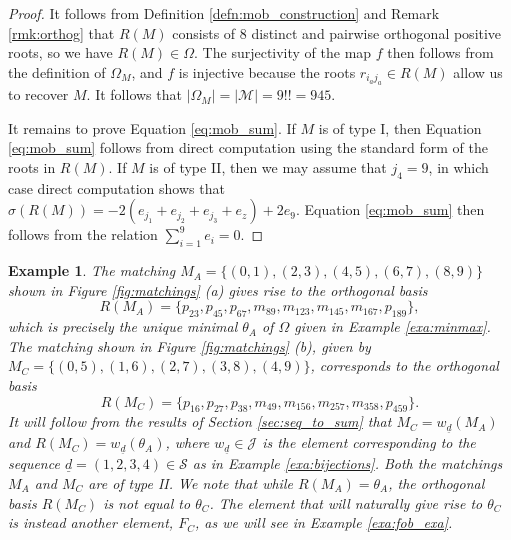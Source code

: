 \documentclass[10pt,a4paper]{amsart}
\newtheorem{exa}[theorem]{Example}
\numberwithin{equation}{section}
\newcommand{\seqd}{\underline{d}}
\newcommand{\calj}{\mathcal{J}}
\newcommand{\calm}{\mathcal{M}}
\newcommand{\cals}{\mathcal{S}}
\newcommand{\ob}{\Omega}
\newcommand{\mob}{\Omega_M}
\newcommand{\abs}[1]{\lvert #1 \rvert}
\begin{document}
\begin{proof}
It follows from Definition \ref{defn:mob_construction} and Remark
\ref{rmk:orthog} that $R(M)$ consists of 8 distinct and pairwise orthogonal
positive roots, so we have $R(M)\in \ob$. The surjectivity of the map $f$ then
follows from the definition of $\mob$, and $f$ is injective because the roots
$r_{i_aj_a}\in R(M)$ allow us to recover $M$. It follows that
$\abs{\mob}=\abs{\calm}=9!!=945.$

It remains to prove Equation \eqref{eq:mob_sum}. If $M$ is of type I, then
Equation \eqref{eq:mob_sum} follows from direct computation using the standard
form of the roots in $R(M)$. If $M$ is of type II, then we may assume that
$j_4=9$, in which case direct computation shows that
$\sigma(R(M))=-2(e_{j_1}+e_{j_2}+e_{j_3}+e_z)+2e_9$. Equation \eqref{eq:mob_sum}
then follows from the relation $\sum_{i=1}^9e _i = 0$. \end{proof}

\begin{exa}
\label{exa:mob_exa}
The matching $M_A=\{(0,1), (2,3), (4,5), (6,7), (8,9)\}$ shown in Figure
\ref{fig:matchings} (a) gives rise to the orthogonal basis 
\[
R(M_A)= \{p_{23}, p_{45}, p_{67}, m_{89}, m_{123}, m_{145}, m_{167}, p_{189}\},
\]
which is precisely the unique minimal $\theta_A$ of $\ob$ given in Example
\ref{exa:minmax}. The matching shown
in Figure \ref{fig:matchings} (b), given by $M_C=\{(0,5), (1,6), (2,7), (3,8),
(4,9)\}$, corresponds 
to the orthogonal basis
\[
R(M_C)= \{p_{16}, p_{27}, p_{38}, m_{49}, m_{156}, m_{257}, m_{358}, p_{459}\}.
\]
It will follow from the results of Section \ref{sec:seq_to_sum} that
$M_C=w_{\seqd}(M_A)$ and $R(M_C)=w_{\seqd}(\theta_A)$, where $w_{\seqd}\in \calj$ is the element
corresponding to the sequence $\seqd=(1,2,3,4)\in \cals$ as in Example
\ref{exa:bijections}. Both the matchings $M_A$ and $M_C$ are of type II. We note
that while $R(M_A)=\theta_A$, the orthogonal basis $R(M_C)$ is not equal to
$\theta_C$. The element that will naturally give rise to $\theta_C$ is instead
another element, $F_C$, as we will see in Example \ref{exa:fob_exa}.

\end{exa}
\end{document}
